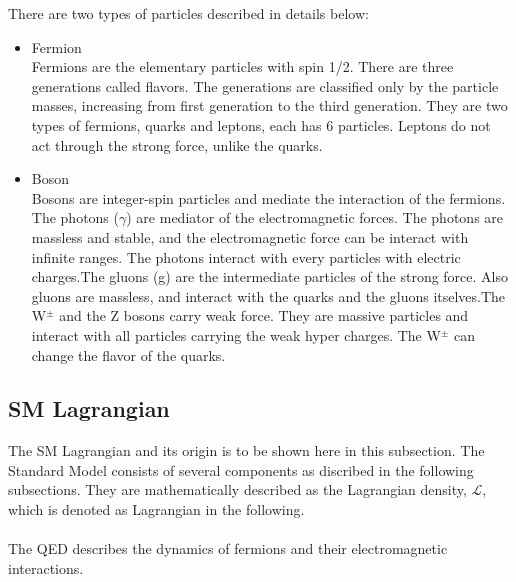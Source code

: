 There are two types of particles described in details below:
\begin{itemize}
    \item Fermion \\
    Fermions are the elementary particles with spin 1/2. There are three generations called flavors. The generations are classified only by the particle masses, increasing from first generation to the third generation. They are two types of fermions, quarks and leptons, each has 6 particles. Leptons do not act through the strong force, unlike the quarks.
    \item Boson \\
    Bosons are integer-spin particles and mediate the interaction of the fermions.
    The photons ($\gamma$) are mediator of the electromagnetic forces. The photons are massless and stable, and the electromagnetic force can be interact with infinite ranges. The photons interact with every particles with electric charges.The gluons (g) are the intermediate particles of the strong force. Also gluons are massless, and interact with the quarks and the gluons itselves.The W$^\pm$ and the Z bosons carry weak force. They are massive particles and interact with all particles carrying the weak hyper charges. The W$^\pm$ can change the flavor of the quarks. 
\end{itemize}

\subsection{SM Lagrangian}
\label{subsec:Lagrangian}
The SM Lagrangian and its origin is to be shown here in this subsection. 
The Standard Model consists of several components as discribed in the following subsections. They are mathematically described as the Lagrangian density, $\mathcal{L}$, which is denoted as Lagrangian in the following.\\

\noindent\textbf{} \\ 
The QED describes the dynamics of fermions and their electromagnetic interactions.

